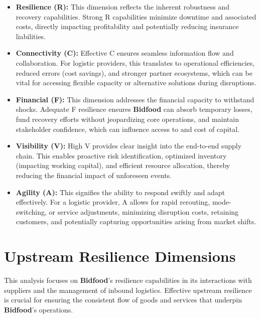 \documentclass[
  oneside,
  open=any,
  fontsize=11pt]{scrbook}
\providecommand{\tightlist}{%
  \setlength{\itemsep}{0pt}\setlength{\parskip}{0pt}}
\begin{document}
\begin{itemize}
\tightlist
\item
  \textbf{Resilience (R):} This dimension reflects the inherent
  robustness and recovery capabilities. Strong R capabilities minimize
  downtime and associated costs, directly impacting profitability and
  potentially reducing insurance liabilities.
\item
  \textbf{Connectivity (C):} Effective C ensures seamless information
  flow and collaboration. For logistic providers, this translates to
  operational efficiencies, reduced errors (cost savings), and stronger
  partner ecosystems, which can be vital for accessing flexible capacity
  or alternative solutions during disruptions.
\item
  \textbf{Financial (F):} This dimension addresses the financial
  capacity to withstand shocks. Adequate F resilience ensures
  \textbf{Bidfood} can absorb temporary losses, fund recovery efforts
  without jeopardizing core operations, and maintain stakeholder
  confidence, which can influence access to and cost of capital.
\item
  \textbf{Visibility (V):} High V provides clear insight into the
  end-to-end supply chain. This enables proactive risk identification,
  optimized inventory (impacting working capital), and efficient
  resource allocation, thereby reducing the financial impact of
  unforeseen events.
\item
  \textbf{Agility (A):} This signifies the ability to respond swiftly
  and adapt effectively. For a logistic provider, A allows for rapid
  rerouting, mode-switching, or service adjustments, minimizing
  disruption costs, retaining customers, and potentially capturing
  opportunities arising from market shifts.
\end{itemize}

\section{Upstream Resilience
Dimensions}\label{upstream-resilience-dimensions}

This analysis focuses on \textbf{Bidfood}'s resilience capabilities in
its interactions with suppliers and the management of inbound logistics.
Effective upstream resilience is crucial for ensuring the consistent
flow of goods and services that underpin \textbf{Bidfood}'s operations.
\end{document}
